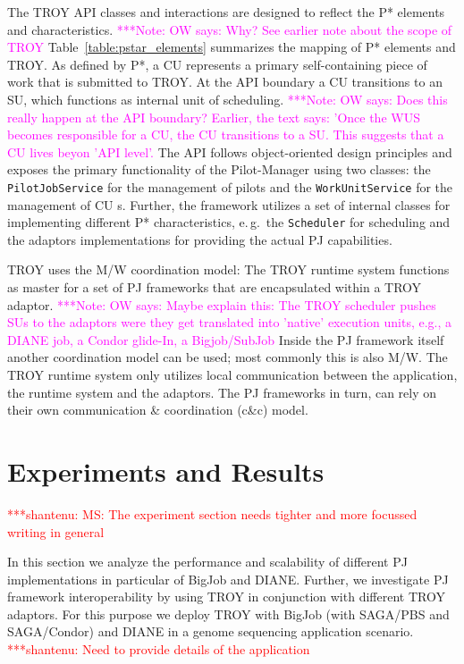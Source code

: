 \documentclass[conference,final]{IEEEtran}
\newcommand{\jhanote}[1]{ {\textcolor{red} { ***shantenu: #1 }}}
\newcommand{\note}[1]{ {\textcolor{magenta} { ***Note: #1 }}}
\newcommand{\jhanote}[1]{}
\newcommand{\note}[1]{}
\newcommand{\cu}{CU\xspace}
\newcommand{\upp}{\vspace*{-0.5em}}
\begin{document}
The TROY API classes and interactions are designed to reflect the P*
elements and characteristics.
\note{OW says: Why? See earlier note about the scope of TROY}
Table~\ref{table:pstar_elements}
summarizes the mapping of P* elements and TROY. As defined by P*, a \cu 
represents a primary self-containing piece of work that is submitted
to TROY. At the API boundary a \cu  transitions to an SU, which
functions as internal unit of scheduling.
\note{OW says: Does this really happen at the API boundary? Earlier, 
the text says: 'Once the WUS becomes responsible for a CU, the CU
transitions to a SU. This suggests that a CU lives beyon 'API level'.}
The API follows
object-oriented design principles and exposes the primary
functionality of the Pilot-Manager using two classes: the
\texttt{PilotJobService} for the management of pilots and the
\texttt{WorkUnitService} for the management of \cu s. Further, the
framework utilizes a set of internal classes for implementing
different P* characteristics, e.\,g.\ the \texttt{Scheduler} for
scheduling and the adaptors implementations for providing the actual
PJ capabilities.

TROY uses the M/W coordination model: The TROY runtime system
functions as master for a set of PJ frameworks that are encapsulated
within a TROY adaptor.
\note{OW says: Maybe explain this: The TROY scheduler pushes SUs
to the adaptors were they get translated into 'native' execution units,
e.g., a DIANE job, a Condor glide-In, a Bigjob/SubJob}
 Inside the PJ framework itself another
coordination model can be used; most commonly this is also M/W. The
TROY runtime system only utilizes local communication between the
application, the runtime system and the adaptors. The PJ frameworks in
turn, can rely on their own communication \& coordination (c\&c)
model.



\section{Experiments and Results\upp\upp}
\label{sec:exp_res}

\jhanote{MS: The experiment section needs tighter and more focussed
  writing in general}

In this section we analyze the performance and scalability of
different PJ implementations in particular of BigJob and
DIANE. Further, we investigate PJ framework interoperability by using
TROY in conjunction with different TROY adaptors. For this purpose we
deploy TROY with BigJob (with SAGA/PBS and SAGA/Condor) and DIANE in a
genome sequencing application scenario. \jhanote{Need to provide
  details of the application} 
\end{document}
